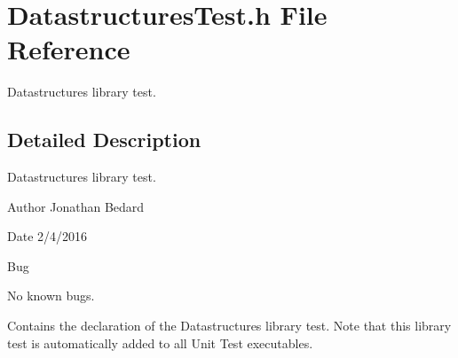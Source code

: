 \section{Datastructures\+Test.\+h File Reference}
\label{DatastructuresTest_8h}


Datastructures library test.  




\subsection{Detailed Description}
Datastructures library test. 

\begin{DoxyAuthor}{Author}
Jonathan Bedard 
\end{DoxyAuthor}
\begin{DoxyDate}{Date}
2/4/2016 
\end{DoxyDate}
\begin{DoxyRefDesc}{Bug}
\item[{\bf Bug}]No known bugs.\end{DoxyRefDesc}


Contains the declaration of the Datastructures library test. Note that this library test is automatically added to all Unit Test executables. 